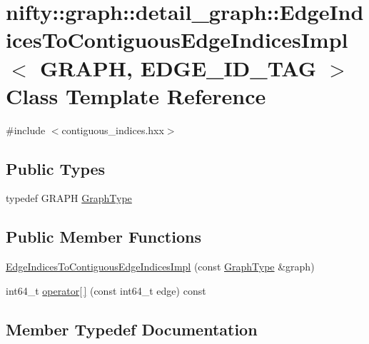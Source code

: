 \hypertarget{classnifty_1_1graph_1_1detail__graph_1_1EdgeIndicesToContiguousEdgeIndicesImpl}{}\section{nifty\+:\+:graph\+:\+:detail\+\_\+graph\+:\+:Edge\+Indices\+To\+Contiguous\+Edge\+Indices\+Impl$<$ G\+R\+A\+PH, E\+D\+G\+E\+\_\+\+I\+D\+\_\+\+T\+AG $>$ Class Template Reference}
\label{classnifty_1_1graph_1_1detail__graph_1_1EdgeIndicesToContiguousEdgeIndicesImpl}


{\ttfamily \#include $<$contiguous\+\_\+indices.\+hxx$>$}

\subsection*{Public Types}
\begin{DoxyCompactItemize}
\item 
typedef G\+R\+A\+PH \hyperlink{classnifty_1_1graph_1_1detail__graph_1_1EdgeIndicesToContiguousEdgeIndicesImpl_a9a93d5ced427774523bdbce7912d1788}{Graph\+Type}
\end{DoxyCompactItemize}
\subsection*{Public Member Functions}
\begin{DoxyCompactItemize}
\item 
\hyperlink{classnifty_1_1graph_1_1detail__graph_1_1EdgeIndicesToContiguousEdgeIndicesImpl_a00a49b794117958e1b0303322c4965cb}{Edge\+Indices\+To\+Contiguous\+Edge\+Indices\+Impl} (const \hyperlink{classnifty_1_1graph_1_1detail__graph_1_1EdgeIndicesToContiguousEdgeIndicesImpl_a9a93d5ced427774523bdbce7912d1788}{Graph\+Type} \&graph)
\item 
int64\+\_\+t \hyperlink{classnifty_1_1graph_1_1detail__graph_1_1EdgeIndicesToContiguousEdgeIndicesImpl_ae161e5dfac99c6d9109450aac9a891ac}{operator\mbox{[}$\,$\mbox{]}} (const int64\+\_\+t edge) const
\end{DoxyCompactItemize}


\subsection{Member Typedef Documentation}
\mbox{\label{classnifty_1_1graph_1_1detail__graph_1_1EdgeIndicesToContiguousEdgeIndicesImpl_a9a93d5ced427774523bdbce7912d1788}} 
